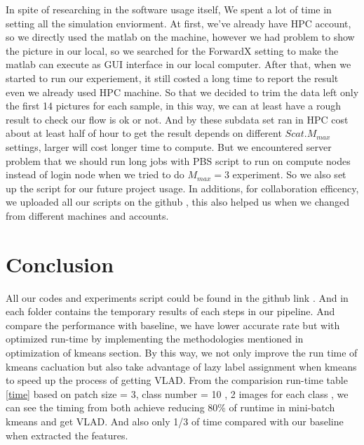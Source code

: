 \documentclass[final,leqno,onefignum,onetabnum]{siamltexmm}
\begin{document}
In spite of researching in the software usage itself, We spent a lot of time in setting all the simulation enviorment. At first, we've already have HPC account, so we directly used the matlab on the machine, however we had problem to show the picture in our local, so we searched for the ForwardX setting to make the matlab can execute as GUI interface in our local computer. After that, when we started to run our experiement, it still costed a long time to report the result even we already used HPC machine. So that we decided to trim the data left only the first 14 pictures for each sample, in this way, we can at least have a rough result to check our flow is ok or not. And by these subdata set ran in HPC cost about at least half of hour to get the result depends on different $Scat. M_{max}$ settings, larger will cost longer time to compute. But we encountered server problem that we should run long jobs with PBS script to run on compute nodes instead of login node when we tried to do $M_{max} = 3$ experiment. So we also set up the script for our future project usage.
In additions, for collaboration efficency, we uploaded all our scripts on the github \cite{github}, this also helped us when we changed from different machines and accounts. 





\section{Conclusion} 
All our codes and experiments script could be found in the github link \cite{github_final}. And in each folder contains the temporary results of each steps in our pipeline. And compare the performance with baseline, we have lower accurate rate but with optimized run-time by implementing the methodologies mentioned in optimization of kmeans section. By this way, we not only improve the run time of kmeans cacluation but also take advantage of lazy label assignment when kmeans to speed up the process of getting VLAD. From the comparision run-time table \ref{time} based on  patch size = 3, class number = 10 , 2 images for each class , we can see the timing from both achieve reducing 80\% of runtime in mini-batch kmeans and get VLAD. And also only 1/3 of time compared with our baseline when extracted the features.
\end{document}
